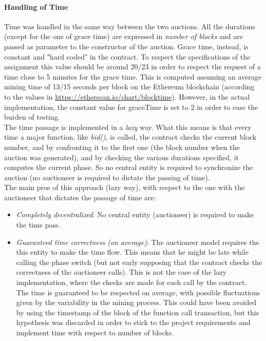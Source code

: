 \documentclass[11pt, a4paper]{report}
\begin{document}
	\paragraph*{Handling of Time}
	Time was handled in the same way between the two auctions. All the durations (except for the one of grace time) are expressed in \emph{number of blocks} and are passed as parameter to the constructor of the auction. Grace time, instead, is constant and "hard coded" in the contract. To respect the specifications of the assignment this value should be around 20/23 in order to respect the request of a time close to 5 minutes for the grace time. This is computed assuming an average mining time of 13/15 seconds per block on the Ethereum blockchain (according to the values in \url{https://etherscan.io/chart/blocktime}). However, in the actual implementation, the constant value for graceTime is set to 2 in order to ease the burden of testing. \\
	The time passage is implemented in a \emph{lazy} way. What this means is that every time a major function, like \emph{bid()}, is called, the contract checks the current block number, and by confronting it to the first one (the block number when the auction was generated), and by checking the various durations specified, it computes the current phase. So no central entity is required to synchronize the auction (no auctioneer is required to dictate the passing of time). \\
	The main pros of this approach (lazy way), with respect to the one with the auctioneer that dictates the passage of time are:
	\begin{itemize}
		\item \emph{Completely decentralized}: No central entity (auctioneer) is required to make the time pass.
		\item \emph{Guaranteed time correctness (on average)}: The auctioneer model requires the this entity to make the time flow. This means that he might be late while calling the phase switch (but not early supposing that the contract checks the correctness of the auctioneer calls). This is not the case of the lazy implementation, where the checks are made for each call by the contract.\\ The time is guaranteed to be respected on average, with possible fluctuations given by the variability in the mining process. This could have been avoided by using the timestamp of the block of the function call transaction, but this hypothesis was discarded in order to stick to the project requirements and implement time with respect to number of blocks.
	\end{itemize}
\end{document}
